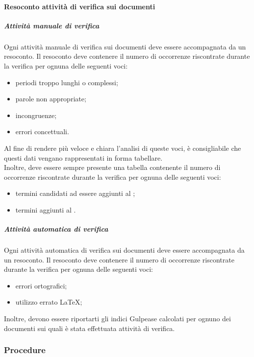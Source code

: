 \documentclass[../NormeProgetto.tex]{subfiles}
\begin{document}
		\paragraph{Resoconto attività di verifica sui documenti}
			\subparagraph{Attività manuale di verifica}		
		Ogni attività manuale di verifica sui documenti deve essere accompagnata da un resoconto. Il resoconto deve contenere il numero di occorrenze riscontrate durante la verifica per ognuna delle seguenti voci:
		\begin{itemize}
			\item periodi troppo lunghi o complessi;
			\item parole non appropriate;
			\item incongruenze;
			\item errori concettuali.		
		\end{itemize}
		Al fine di rendere più veloce e chiara l'analisi di queste voci, è consigliabile che questi dati vengano rappresentati in forma tabellare.\\
		Inoltre, deve essere sempre presente una tabella contenente il numero di occorrenze riscontrate durante la verifica per ognuna delle seguenti voci:
			\begin{itemize}
				\item termini candidati ad essere aggiunti al \glossario;
				\item termini aggiunti al \glossario.
			\end{itemize}
			\subparagraph{Attività automatica di verifica}
			Ogni attività automatica di verifica sui documenti deve essere accompagnata da un resoconto. Il resoconto deve contenere il numero di occorrenze riscontrate durante la verifica per ognuna delle seguenti voci:
			\begin{itemize}
			\item errori ortografici;
			\item utilizzo errato \LaTeX\g;	
			\end{itemize}
		
		Inoltre, devono essere riportarti gli indici Gulpease calcolati per ognuno dei documenti sui quali è stata effettuata attività di verifica.
			
	\subsubsection{Procedure}	
\end{document}
